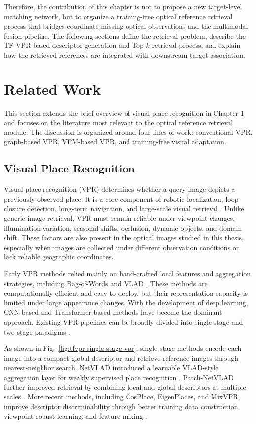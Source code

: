 Therefore, the contribution of this chapter is not to propose a new target-level matching network, but to organize a training-free optical reference retrieval process that bridges coordinate-missing optical observations and the multimodal fusion pipeline. The following sections define the retrieval problem, describe the TF-VPR-based descriptor generation and Top-\(k\) retrieval process, and explain how the retrieved references are integrated with downstream target association.

\section{Related Work}
This section extends the brief overview of visual place recognition in Chapter 1 and focuses on the literature most relevant to the optical reference retrieval module. The discussion is organized around four lines of work: conventional VPR, graph-based VPR, VFM-based VPR, and training-free visual adaptation.

\subsection{Visual Place Recognition}
Visual place recognition (VPR) determines whether a query image depicts a previously observed place. It is a core component of robotic localization, loop-closure detection, long-term navigation, and large-scale visual retrieval \cite{yin2025gprs,murartal2017orbslam2,milford2008seqslam}. Unlike generic image retrieval, VPR must remain reliable under viewpoint changes, illumination variation, seasonal shifts, occlusion, dynamic objects, and domain shift. These factors are also present in the optical images studied in this thesis, especially when images are collected under different observation conditions or lack reliable geographic coordinates.

Early VPR methods relied mainly on hand-crafted local features and aggregation strategies, including Bag-of-Words and VLAD \cite{galvez2012bags,jegou2010vlad}. These methods are computationally efficient and easy to deploy, but their representation capacity is limited under large appearance changes. With the development of deep learning, CNN-based and Transformer-based methods have become the dominant approach. Existing VPR pipelines can be broadly divided into single-stage and two-stage paradigms \cite{wang2026tfvpr}.

As shown in Fig.~\ref{fig:tfvpr-single-stage-vpr}, single-stage methods encode each image into a compact global descriptor and retrieve reference images through nearest-neighbor search. NetVLAD introduced a learnable VLAD-style aggregation layer for weakly supervised place recognition \cite{arandjelovic2016netvlad}. Patch-NetVLAD further improved retrieval by combining local and global descriptors at multiple scales \cite{hausler2021patchnetvlad}. More recent methods, including CosPlace, EigenPlaces, and MixVPR, improve descriptor discriminability through better training data construction, viewpoint-robust learning, and feature mixing \cite{berton2022cosplace,berton2023eigenplaces,alibey2023mixvpr}.

